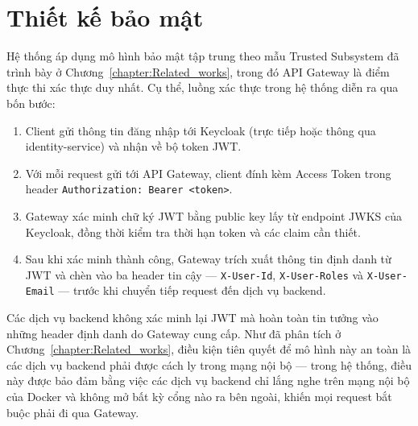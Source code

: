 \documentclass[../DoAn.tex]{subfiles}
\begin{document}
{%


\section{Thiết kế bảo mật}
\label{section:4.8}

Hệ thống áp dụng mô hình bảo mật tập trung theo mẫu Trusted Subsystem đã trình bày ở
Chương~\ref{chapter:Related_works}, trong đó API Gateway là điểm thực thi xác thực duy nhất.
Cụ thể, luồng xác thực trong hệ thống diễn ra qua bốn bước:

\begin{enumerate}[noitemsep]
    \item Client gửi thông tin đăng nhập tới Keycloak (trực tiếp hoặc thông qua
          identity-service) và nhận về bộ token JWT.
    \item Với mỗi request gửi tới API Gateway, client đính kèm Access Token trong header
          \texttt{Authorization: Bearer <token>}.
    \item Gateway xác minh chữ ký JWT bằng public key lấy từ endpoint JWKS của Keycloak, đồng
          thời kiểm tra thời hạn token và các claim cần thiết.
    \item Sau khi xác minh thành công, Gateway trích xuất thông tin định danh từ JWT và chèn
          vào ba header tin cậy --- \texttt{X-User-Id}, \texttt{X-User-Roles} và
          \texttt{X-User-Email} --- trước khi chuyển tiếp request đến dịch vụ backend.
\end{enumerate}

Các dịch vụ backend không xác minh lại JWT mà hoàn toàn tin tưởng vào những header định danh
do Gateway cung cấp. Như đã phân tích ở Chương~\ref{chapter:Related_works}, điều kiện tiên
quyết để mô hình này an toàn là các dịch vụ backend phải được cách ly trong mạng nội bộ ---
trong hệ thống, điều này được bảo đảm bằng việc các dịch vụ backend chỉ lắng nghe trên mạng
nội bộ của Docker và không mở bất kỳ cổng nào ra bên ngoài, khiến mọi request bắt buộc phải đi
qua Gateway.

}
\end{document}
